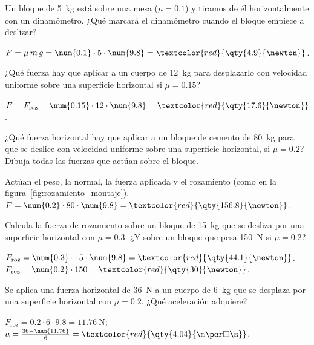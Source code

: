 \begin{exercise}
    Un bloque de \qty{5}{\kg} está sobre una mesa (\(\mu = \num{0.1}\)) y tiramos de él horizontalmente con un dinamómetro. ¿Qué marcará el dinamómetro cuando el bloque empiece a deslizar?
    \begin{solu}
        \(F = \mu\,m\,g = \num{0.1} \cdot 5 \cdot \num{9.8} = \textcolor{red}{\qty{4.9}{\newton}}\).
    \end{solu}
\end{exercise}

\begin{exercise}
    ¿Qué fuerza hay que aplicar a un cuerpo de \qty{12}{\kg} para desplazarlo con velocidad uniforme sobre una superficie horizontal si \(\mu = \num{0.15}\)?
    \begin{solu}
        \(F = F_\text{roz} = \num{0.15} \cdot 12 \cdot \num{9.8} = \textcolor{red}{\qty{17.6}{\newton}}\).
    \end{solu}
\end{exercise}

\begin{exercise}
    ¿Qué fuerza horizontal hay que aplicar a un bloque de cemento de \qty{80}{\kg} para que se deslice con velocidad uniforme sobre una superficie horizontal, si \(\mu = \num{0.2}\)? Dibuja todas las fuerzas que actúan sobre el bloque.
    \begin{solu}
        Actúan el peso, la normal, la fuerza aplicada y el rozamiento (como en la figura~\ref{fig:rozamiento_montaje}). \(F = \num{0.2} \cdot 80 \cdot \num{9.8} = \textcolor{red}{\qty{156.8}{\newton}}\).
    \end{solu}
\end{exercise}

\begin{exercise}
    Calcula la fuerza de rozamiento sobre un bloque de \qty{15}{\kg} que se desliza por una superficie horizontal con \(\mu = \num{0.3}\). ¿Y sobre un bloque que pesa \qty{150}{\newton} si \(\mu = \num{0.2}\)?
    \begin{solu}
        \(F_\text{roz} = \num{0.3} \cdot 15 \cdot \num{9.8} = \textcolor{red}{\qty{44.1}{\newton}}\). \quad \(F_\text{roz} = \num{0.2} \cdot 150 = \textcolor{red}{\qty{30}{\newton}}\).
    \end{solu}
\end{exercise}

\begin{exercise}
    Se aplica una fuerza horizontal de \qty{36}{\newton} a un cuerpo de \qty{6}{\kg} que se desplaza por una superficie horizontal con \(\mu = \num{0.2}\). ¿Qué aceleración adquiere?
    \begin{solu}
        \(F_\text{roz} = \num{0.2} \cdot 6 \cdot \num{9.8} = \qty{11.76}{\newton}\); \(a = \frac{36 - \num{11.76}}{6} = \textcolor{red}{\qty{4.04}{\m\per\square\s}}\).
    \end{solu}
\end{exercise}

